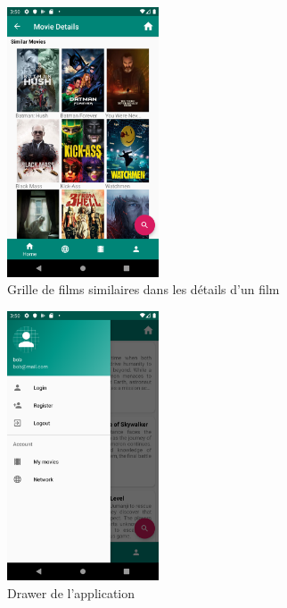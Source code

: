 \begin{figure}
    \begin{center}
        \includegraphics[width=0.4\textwidth]{img/screenshots/similar_movies.png}
    \end{center}
    \caption{Grille de films similaires dans les détails d'un film}
    \label{similar_movies}
\end{figure}

\begin{figure}
    \begin{center}
        \includegraphics[width=0.4\textwidth]{img/screenshots/Drawer.png}
    \end{center}
    \caption{Drawer de l'application}
    \label{drawer}
\end{figure}

